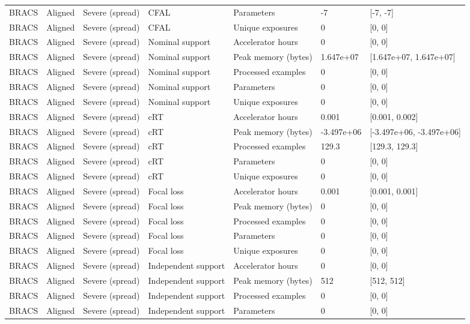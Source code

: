 \begin{longtable}{lllllll}
BRACS & Aligned & Severe (spread) & CFAL & Parameters & -7 & [-7, -7] \\
BRACS & Aligned & Severe (spread) & CFAL & Unique exposures & 0 & [0, 0] \\
BRACS & Aligned & Severe (spread) & Nominal support & Accelerator hours & 0 & [0, 0] \\
BRACS & Aligned & Severe (spread) & Nominal support & Peak memory (bytes) & 1.647e+07 & [1.647e+07, 1.647e+07] \\
BRACS & Aligned & Severe (spread) & Nominal support & Processed examples & 0 & [0, 0] \\
BRACS & Aligned & Severe (spread) & Nominal support & Parameters & 0 & [0, 0] \\
BRACS & Aligned & Severe (spread) & Nominal support & Unique exposures & 0 & [0, 0] \\
BRACS & Aligned & Severe (spread) & cRT & Accelerator hours & 0.001 & [0.001, 0.002] \\
BRACS & Aligned & Severe (spread) & cRT & Peak memory (bytes) & -3.497e+06 & [-3.497e+06, -3.497e+06] \\
BRACS & Aligned & Severe (spread) & cRT & Processed examples & 129.3 & [129.3, 129.3] \\
BRACS & Aligned & Severe (spread) & cRT & Parameters & 0 & [0, 0] \\
BRACS & Aligned & Severe (spread) & cRT & Unique exposures & 0 & [0, 0] \\
BRACS & Aligned & Severe (spread) & Focal loss & Accelerator hours & 0.001 & [0.001, 0.001] \\
BRACS & Aligned & Severe (spread) & Focal loss & Peak memory (bytes) & 0 & [0, 0] \\
BRACS & Aligned & Severe (spread) & Focal loss & Processed examples & 0 & [0, 0] \\
BRACS & Aligned & Severe (spread) & Focal loss & Parameters & 0 & [0, 0] \\
BRACS & Aligned & Severe (spread) & Focal loss & Unique exposures & 0 & [0, 0] \\
BRACS & Aligned & Severe (spread) & Independent support & Accelerator hours & 0 & [0, 0] \\
BRACS & Aligned & Severe (spread) & Independent support & Peak memory (bytes) & 512 & [512, 512] \\
BRACS & Aligned & Severe (spread) & Independent support & Processed examples & 0 & [0, 0] \\
BRACS & Aligned & Severe (spread) & Independent support & Parameters & 0 & [0, 0] \\

\end{longtable}
